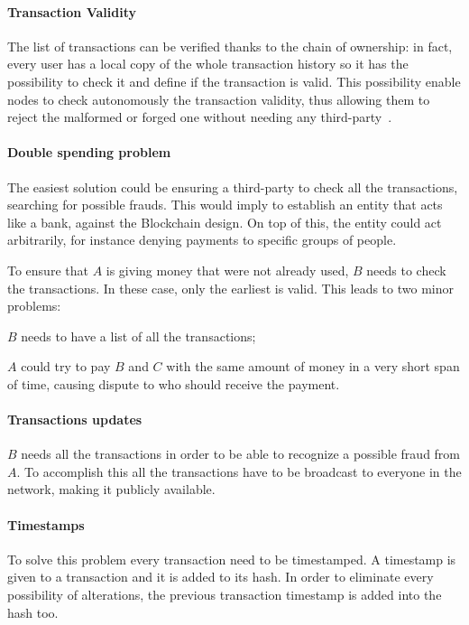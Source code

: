 \paragraph*{Transaction Validity}
The list of transactions can be verified thanks to the chain of ownership:
in fact, every user has a local copy of the whole transaction history so it has
the possibility to check it and define if the transaction is valid.
This possibility enable nodes to check autonomously the transaction validity,
thus allowing them to reject the malformed or forged one without needing any
third-party~\cite{nakamoto08}.

\paragraph*{Double spending problem}
The easiest solution could be ensuring a third-party to check all the
transactions, searching for possible frauds. This would imply to establish an
entity that acts like a bank, against the Blockchain design. On top of this,
the entity could act arbitrarily, for instance denying payments to specific
groups of people.

To ensure that $A$ is giving money that were not already used, $B$ needs to
check the transactions. In these case, only the earliest is
valid\cite{nakamoto08}. This leads to two minor problems:
\begin{enumerate*}[label=\roman*)]
 \item $B$ needs to have a list of all the transactions;
 \item $A$ could try to pay $B$ and $C$ with the same amount of money in a very
short span of time, causing dispute to who should receive the payment.
\end{enumerate*}

\paragraph*{Transactions updates}
\label{TU}
$B$ needs all the transactions in order to be able to recognize a possible
fraud from $A$. To accomplish this all the transactions have to be broadcast to
everyone in the network, making it publicly available.

\paragraph*{Timestamps}
To solve this problem every transaction need to be timestamped. A timestamp is
given to a transaction and it is added to its hash. In order to eliminate every
possibility of alterations, the previous transaction timestamp is added into
the hash too\cite{nakamoto08}.


